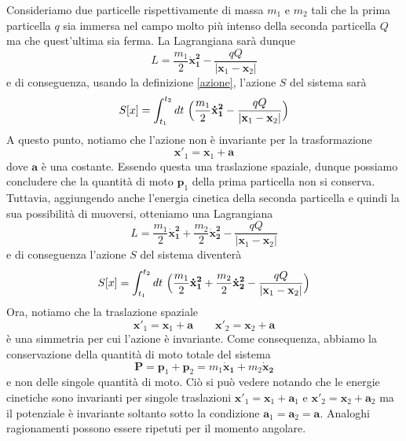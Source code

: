 \begin{example} 
    Consideriamo due particelle rispettivamente di massa $m_1$ e $m_2$ tali che la prima particella $q$ sia immersa nel campo molto più intenso della seconda particella $Q$ ma che quest'ultima sia ferma. La Lagrangiana sarà dunque 
\begin{equation}
    L = \frac{m_1}{2} \mathbf{\dot x_1^2} - \frac{qQ}{|\mathbf x_1 - \mathbf x_2|}
\end{equation}
    e di conseguenza, usando la definizione \eqref{azione}, l'azione $S$ del sistema sarà
\begin{equation}
    S[x] = \int_{t_1}^{t_2}dt~ \Big( \frac{m_1}{2} \mathbf{\dot x_1^2} - \frac{qQ}{|\mathbf x_1 - \mathbf x_2|} \Big)
\end{equation}
    A questo punto, notiamo che l'azione non è invariante per la trasformazione 
\begin{equation}
    \mathbf x'_1 = \mathbf x_1 + \mathbf a
\end{equation}
    dove $\mathbf a$ è una costante. Essendo questa una traslazione spaziale, dunque possiamo concludere che la quantità di moto $\mathbf p_1$ della prima particella non si conserva. Tuttavia, aggiungendo anche l'energia cinetica della seconda particella e quindi la sua possibilità di muoversi, otteniamo una Lagrangiana  
\begin{equation}
    L = \frac{m_1}{2} \mathbf{\dot x_1^2} + \frac{m_2}{2} \mathbf{\dot x_2^2} - \frac{qQ}{|\mathbf x_1 - \mathbf x_2|}
\end{equation}
    e di conseguenza l'azione $S$ del sistema diventerà
\begin{equation}
    S[x] = \int_{t_1}^{t_2}dt~ \Big( \frac{m_1}{2} \mathbf{\dot x_1^2} + \frac{m_2}{2} \mathbf{\dot x_2^2} - \frac{qQ}{|\mathbf x_1 - \mathbf x_2|} \Big)
\end{equation}
    Ora, notiamo che la traslazione spaziale 
\begin{equation}
    \mathbf x'_1 = \mathbf x_1 + \mathbf a \qquad \mathbf x'_2 = \mathbf x_2 + \mathbf a
\end{equation}
    è una simmetria per cui l'azione è invariante. Come consequenza, abbiamo la conservazione della quantità di moto totale del sistema
\begin{equation*}
    \mathbf P = \mathbf p_1 + \mathbf p_2 = m_1 \mathbf{\dot x_1} + m_2 \mathbf{\dot x_2}
\end{equation*}
    e non delle singole quantità di moto. Ciò si può vedere notando che le energie cinetiche sono invarianti per singole traslazioni $\mathbf x'_1 = \mathbf x_1 + \mathbf a_1$ e $\mathbf x'_2 = \mathbf x_2 + \mathbf a_2$ ma il potenziale è invariante soltanto sotto la condizione $\mathbf a_1 = \mathbf a_2 = \mathbf a$. Analoghi ragionamenti possono essere ripetuti per il momento angolare.
\end{example}

